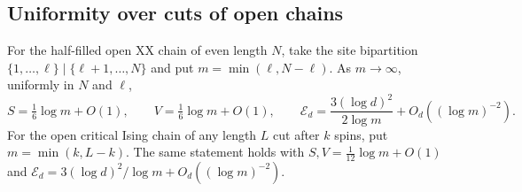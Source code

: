 \subsection{Uniformity over cuts of open chains}

\begin{corollary}
\label{cor:chain-arbitrary-cuts}
For the half-filled open XX chain of even length $N$, take the site
bipartition $\{1,\ldots,\ell\}\mid\{\ell+1,\ldots,N\}$ and put
$m=\min(\ell,N-\ell)$. As $m\to\infty$, uniformly in $N$ and $\ell$,
\[
 S=\tfrac16\log m+O(1),\qquad V=\tfrac16\log m+O(1),\qquad
 \mathcal E_d=\frac{3(\log d)^2}{2\log m}+O_d((\log m)^{-2}).
\]
For the open critical Ising chain of any length $L$ cut after $k$ spins,
put $m=\min(k,L-k)$. The same statement holds with
$S,V=\tfrac1{12}\log m+O(1)$ and
$\mathcal E_d=3(\log d)^2/\log m+O_d((\log m)^{-2})$.
\end{corollary}

